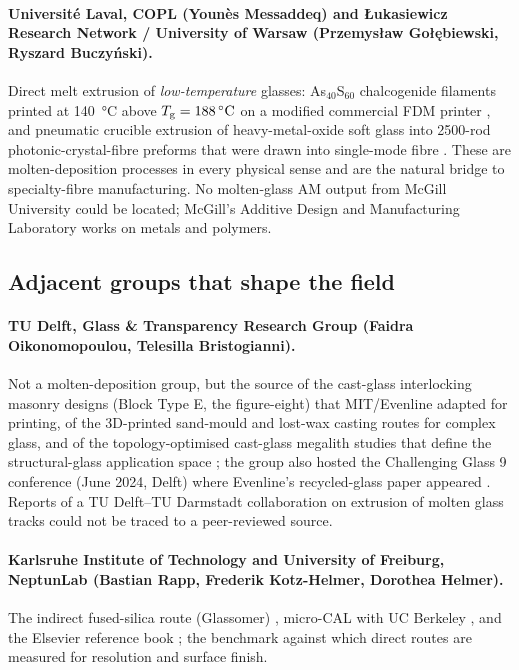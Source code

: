 \paragraph{Universit\'e Laval, COPL (Youn\`es Messaddeq) and \L{}ukasiewicz Research Network / University of Warsaw (Przemys\l{}aw Go\l{}\k{e}biewski, Ryszard Buczy\'nski).} Direct melt extrusion of \emph{low-temperature} glasses: As$_{40}$S$_{60}$ chalcogenide filaments printed at \SI{140}{\celsius} above \(T_{\mathrm{g}} = \SI{188}{\celsius}\) on a modified commercial FDM printer \citep{baudet2019}, and pneumatic crucible extrusion of heavy-metal-oxide soft glass into 2500-rod photonic-crystal-fibre preforms that were drawn into single-mode fibre \citep{laval2023preform}. These are molten-deposition processes in every physical sense and are the natural bridge to specialty-fibre manufacturing. No molten-glass AM output from McGill University could be located; McGill's Additive Design and Manufacturing Laboratory works on metals and polymers.

\subsection{Adjacent groups that shape the field}
\paragraph{TU Delft, Glass \& Transparency Research Group (Faidra Oikonomopoulou, Telesilla Bristogianni).} Not a molten-deposition group, but the source of the cast-glass interlocking masonry designs (Block Type E, the figure-eight) that MIT/Evenline adapted for printing, of the 3D-printed sand-mould and lost-wax casting routes for complex glass, and of the topology-optimised cast-glass megalith studies that define the structural-glass application space \citep{mit2024masonry}; the group also hosted the Challenging Glass 9 conference (June 2024, Delft) where Evenline's recycled-glass paper appeared \citep{stern2024cgc}. Reports of a TU Delft--TU Darmstadt collaboration on extrusion of molten glass tracks could not be traced to a peer-reviewed source.

\paragraph{Karlsruhe Institute of Technology and University of Freiburg, NeptunLab (Bastian Rapp, Frederik Kotz-Helmer, Dorothea Helmer).} The indirect fused-silica route (Glassomer) \citep{kotz2017,mader2021}, micro-CAL with UC Berkeley \citep{toombs2022}, and the Elsevier reference book \citep{rappkotz2024book}; the benchmark against which direct routes are measured for resolution and surface finish.

